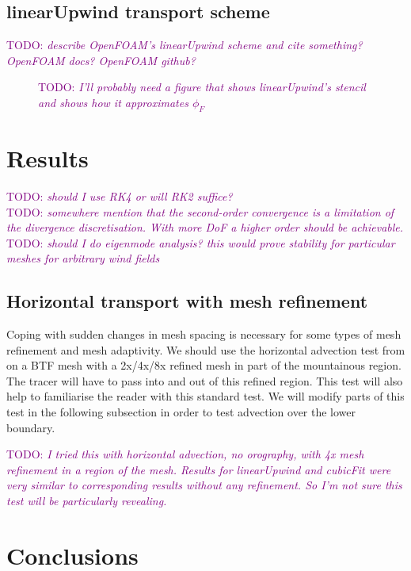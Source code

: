 \documentclass[times]{elsarticle}
\newcommand{\TODO}[1]{\textcolor{purple}{TODO: \emph{#1}}}
\begin{document}

\subsection{linearUpwind transport scheme}
\TODO{describe OpenFOAM's linearUpwind scheme and cite something? OpenFOAM docs? OpenFOAM github?}

\begin{figure}
	\caption{\TODO{I'll probably need a figure that shows linearUpwind's stencil and shows how it approximates $\phi_F$}}
\end{figure}

\section{Results}
\TODO{should I use RK4 or will RK2 suffice?} \\
\TODO{somewhere mention that the second-order convergence is a limitation of the divergence discretisation.  With more DoF a higher order should be achievable.} \\
\TODO{should I do eigenmode analysis?  this would prove stability for particular meshes for arbitrary wind fields}

\subsection{Horizontal transport with mesh refinement}
Coping with sudden changes in mesh spacing is necessary for some types of mesh refinement and mesh adaptivity.  We should use the horizontal advection test from \citet{schaer2002} on a BTF mesh with a 2x/4x/8x refined mesh in part of the mountainous region.  The tracer will have to pass into and out of this refined region.  This test will also help to familiarise the reader with this standard test.  We will modify parts of this test in the following subsection in order to test advection over the lower boundary.

\TODO{I tried this with horizontal advection, no orography, with 4x mesh refinement in a region of the mesh.  Results for linearUpwind and cubicFit were very similar to corresponding results without any refinement.  So I'm not sure this test will be particularly revealing.}





\section{Conclusions}
\end{document}
